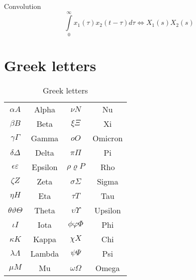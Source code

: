\documentclass{article}
\begin{document}
			Convolution
			\begin{equation}
			\int\limits_0^\infty {x_1 (\tau )x_2 (t - \tau )d\tau } \Leftrightarrow X_1 (s)X_2 (s)
			\end{equation}
\section{Greek letters}

\bgroup
\def\arraystretch{2}
\begin{table}[hbp]
  \centering
  \begin{tabular}{cccc}
  \hline
  	$\alpha A$				& Alpha		& $\nu N$		& Nu	\\
  	$\beta B$				& Beta		& $\xi \Xi$	&  Xi 		\\
  	$\gamma \Gamma$			& Gamma		& $o O$	& Omicron		\\
	$\delta \Delta$			& Delta 	& $\pi \Pi$	& Pi		\\
	$\epsilon \varepsilon $	& Epsilon	& $\rho\varrho P$ & Rho   \\
	$\zeta Z$				& Zeta		& $\sigma \Sigma$& Sigma  	\\
	$\eta H$				& Eta		& $\tau T$	& Tau  		\\  
	$\theta \vartheta \Theta$	& Theta & $\upsilon \Upsilon$ & Upsilon  \\
	$\iota I$				& Iota		& $\phi \varphi \Phi$ & Phi    \\
	$\kappa K$				& Kappa		& $\chi X$	& Chi  		\\
	$\lambda \Lambda$		& Lambda	& $\psi \Psi$	& Psi  	\\
	$\mu M$					& Mu 		& $\omega \Omega$ & Omega   \\
  
  \hline
  \end{tabular}
  \caption{Greek letters}
  \label{tab:symbol-variants}
\end{table}
\egroup
\end{document}
